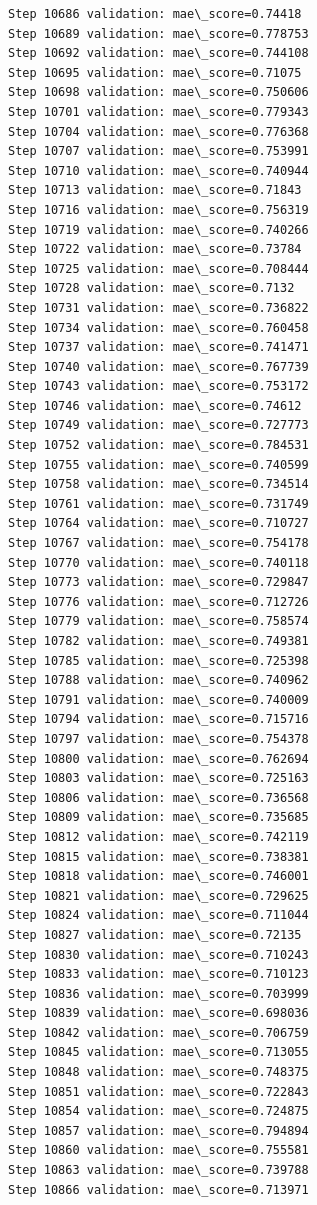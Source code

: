 \documentclass[11pt]{article}
\begin{document}
\begin{Verbatim}[commandchars=\\\{\}]
Step 10686 validation: mae\_score=0.74418
Step 10689 validation: mae\_score=0.778753
Step 10692 validation: mae\_score=0.744108
Step 10695 validation: mae\_score=0.71075
Step 10698 validation: mae\_score=0.750606
Step 10701 validation: mae\_score=0.779343
Step 10704 validation: mae\_score=0.776368
Step 10707 validation: mae\_score=0.753991
Step 10710 validation: mae\_score=0.740944
Step 10713 validation: mae\_score=0.71843
Step 10716 validation: mae\_score=0.756319
Step 10719 validation: mae\_score=0.740266
Step 10722 validation: mae\_score=0.73784
Step 10725 validation: mae\_score=0.708444
Step 10728 validation: mae\_score=0.7132
Step 10731 validation: mae\_score=0.736822
Step 10734 validation: mae\_score=0.760458
Step 10737 validation: mae\_score=0.741471
Step 10740 validation: mae\_score=0.767739
Step 10743 validation: mae\_score=0.753172
Step 10746 validation: mae\_score=0.74612
Step 10749 validation: mae\_score=0.727773
Step 10752 validation: mae\_score=0.784531
Step 10755 validation: mae\_score=0.740599
Step 10758 validation: mae\_score=0.734514
Step 10761 validation: mae\_score=0.731749
Step 10764 validation: mae\_score=0.710727
Step 10767 validation: mae\_score=0.754178
Step 10770 validation: mae\_score=0.740118
Step 10773 validation: mae\_score=0.729847
Step 10776 validation: mae\_score=0.712726
Step 10779 validation: mae\_score=0.758574
Step 10782 validation: mae\_score=0.749381
Step 10785 validation: mae\_score=0.725398
Step 10788 validation: mae\_score=0.740962
Step 10791 validation: mae\_score=0.740009
Step 10794 validation: mae\_score=0.715716
Step 10797 validation: mae\_score=0.754378
Step 10800 validation: mae\_score=0.762694
Step 10803 validation: mae\_score=0.725163
Step 10806 validation: mae\_score=0.736568
Step 10809 validation: mae\_score=0.735685
Step 10812 validation: mae\_score=0.742119
Step 10815 validation: mae\_score=0.738381
Step 10818 validation: mae\_score=0.746001
Step 10821 validation: mae\_score=0.729625
Step 10824 validation: mae\_score=0.711044
Step 10827 validation: mae\_score=0.72135
Step 10830 validation: mae\_score=0.710243
Step 10833 validation: mae\_score=0.710123
Step 10836 validation: mae\_score=0.703999
Step 10839 validation: mae\_score=0.698036
Step 10842 validation: mae\_score=0.706759
Step 10845 validation: mae\_score=0.713055
Step 10848 validation: mae\_score=0.748375
Step 10851 validation: mae\_score=0.722843
Step 10854 validation: mae\_score=0.724875
Step 10857 validation: mae\_score=0.794894
Step 10860 validation: mae\_score=0.755581
Step 10863 validation: mae\_score=0.739788
Step 10866 validation: mae\_score=0.713971

\end{Verbatim}
\end{document}
